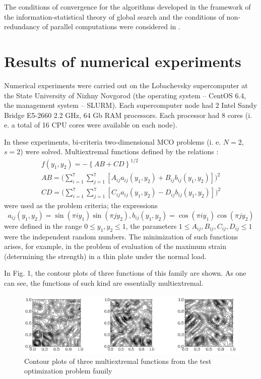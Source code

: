 \documentclass[runningheads]{llncs}
\begin{document}
The conditions of convergence for the algorithms developed in the framework of the information-statistical theory of global search and the conditions of non-redundancy of parallel computations were considered in \cite{c10}. 

\section{Results of numerical experiments} \label{sec:5}

Numerical experiments were carried out on the Lobachevsky supercomputer at the State University of Nizhny Novgorod (the operating system -- CentOS 6.4, the management system -- SLURM). Each supercomputer node had 2 Intel Sandy Bridge E5-2660 2.2 GHz, 64 Gb RAM processors. Each processor had 8 cores (i. e. a total of 16 CPU cores were available on each node).

In these experiments, bi-criteria two-dimensional MCO problems (i. e. $N=2$, $s=2$) were solved. Multiextremal functions defined by the relations \cite{c10}:
\begin{equation}
\begin{split}
f(y_1, y_2) = - \left\{ AB + CD \right\}^{1/2} \\
AB = \Big(\sum_{i=1}^7 \sum_{j=1}^7 [A_{ij} a_{ij}(y_1, y_2) + B_{ij} b_{ij}(y_1, y_2)]\Big)^2 \\
CD = \Big(\sum_{i=1}^7 \sum_{j=1}^7 [C_{ij} a_{ij}(y_1, y_2) - D_{ij} b_{ij}(y_1, y_2)]\Big)^2 
\end{split}
\label{eq:20}
\end{equation}
were used as the problem criteria; the expressions 
\begin{equation}
a_{ij}(y_1, y_2) = \sin(\pi i y_1) \sin(\pi j y_2), b_{ij}(y_1, y_2) = \cos(\pi i y_1) \cos(\pi j y_2)
\end{equation}
were defined in the range $0 \leq y_1,y_2 \leq 1$, the parameters $1 \leq A_{ij},B_{ij},C_{ij},D_{ij} \leq 1$ were the independent random numbers. The minimization of such functions arises, for example, in the problem of evaluation of the maximum strain (determining the strength) in a thin plate under the normal load. 

In Fig. 1, the contour plots of three functions of this family are shown. As one can see, the functions of such kind are essentially multiextremal. 
\begin{figure}[t]
\includegraphics[width=\textwidth]{CP024_fig1}
\caption{Contour plots of three multiextremal functions from the test optimization problem family} 
\label{fig:1}
\end{figure}
\end{document}
